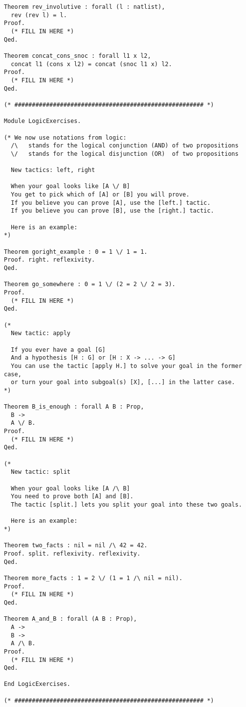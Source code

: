 \begin{verbatim}
Theorem rev_involutive : forall (l : natlist),
  rev (rev l) = l.
Proof.
  (* FILL IN HERE *)
Qed.

Theorem concat_cons_snoc : forall l1 x l2,
  concat l1 (cons x l2) = concat (snoc l1 x) l2.
Proof.
  (* FILL IN HERE *)
Qed.

(* ###################################################### *)

Module LogicExercises.

(* We now use notations from logic:
  /\   stands for the logical conjunction (AND) of two propositions
  \/   stands for the logical disjunction (OR)  of two propositions

  New tactics: left, right

  When your goal looks like [A \/ B]
  You get to pick which of [A] or [B] you will prove.
  If you believe you can prove [A], use the [left.] tactic.
  If you believe you can prove [B], use the [right.] tactic.

  Here is an example:
*)

Theorem goright_example : 0 = 1 \/ 1 = 1.
Proof. right. reflexivity.
Qed.

Theorem go_somewhere : 0 = 1 \/ (2 = 2 \/ 2 = 3).
Proof.
  (* FILL IN HERE *)
Qed.

(*
  New tactic: apply

  If you ever have a goal [G]
  And a hypothesis [H : G] or [H : X -> ... -> G]
  You can use the tactic [apply H.] to solve your goal in the former case,
  or turn your goal into subgoal(s) [X], [...] in the latter case.
*)

Theorem B_is_enough : forall A B : Prop,
  B ->
  A \/ B.
Proof.
  (* FILL IN HERE *)
Qed.

(*
  New tactic: split

  When your goal looks like [A /\ B]
  You need to prove both [A] and [B].
  The tactic [split.] lets you split your goal into these two goals.

  Here is an example:
*)

Theorem two_facts : nil = nil /\ 42 = 42.
Proof. split. reflexivity. reflexivity.
Qed.

Theorem more_facts : 1 = 2 \/ (1 = 1 /\ nil = nil).
Proof.
  (* FILL IN HERE *)
Qed.

Theorem A_and_B : forall (A B : Prop),
  A ->
  B ->
  A /\ B.
Proof.
  (* FILL IN HERE *)
Qed.

End LogicExercises.

(* ###################################################### *)


\end{verbatim}
